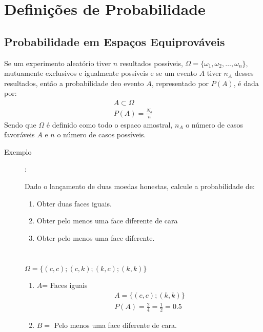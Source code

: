 \documentclass[11pt,a4paper]{book}
\begin{document}
\begin{description}
\begin{description}
\end{description}
\section{Definições de Probabilidade}
\subsection{Probabilidade em Espaços Equiprováveis}
Se um experimento aleatório tiver $n$ resultados possíveis, $\Omega = \{ \omega_1,\omega_2,\ldots,\omega_n \}$, mutuamente exclusivos e igualmente possíveis e se um evento $A$ tiver $n_A$ desses resultados, então a probabilidade deo evento $A$, representado por $P(A)$, é dada por: 
\begin{align}
  A \subset \Omega \nonumber\\
  P(A)= \frac{N_a}{n} 
\end{align}
Sendo que $\Omega$ é definido como todo o espaco amostral, $n_A$ o número de casos favoráveis $A$ e $n$ o número de casos possíveis.

\begin{description}
\item [Exemplo]: 

Dado o lançamento de duas moedas honestas, calcule a probabilidade de: 
\begin{enumerate}[label=(\alph*)]
  \item  Obter duas faces iguais.
  \item Obter pelo menos uma face diferente de cara
  \item  Obter pelo menos uma face diferente.
\end{enumerate}

\begin{table}[]
  \centering
  \caption{}
  \label{}
  \begin{tabular}{}

  \end{tabular}
\end{table}
$\Omega = \{ (c,c); (c,k); (k,c) ; (k,k)\}$

\begin{enumerate}[label=(\alph*)]
  \item $A$= Faces iguais
    \begin{align*}
      A= \{ (c,c) ; (k,k) \} \\
      P(A) = \frac{2}{4} = \frac{1}{2}= 0.5
    \end{align*}
  \item $B=$ Pelo menos uma face diferente de cara.


\end{enumerate}
\end{description}
\end{description}
\end{document}
